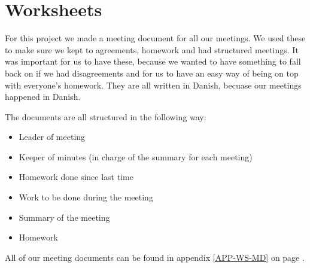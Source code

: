 \chapter{Worksheets}
For this project we made a meeting document for all our meetings. We used
these to make sure we kept to agreements, homework and had structured meetings. It
was important for us to have these, because we wanted to have something to fall
back on if we had disagreements and for us to have an easy way of being on top
with everyone's homework. They are all written in Danish, becuase our meetings
happened in Danish.

The documents are all structured in the following way: 
\begin{itemize}
  \item Leader of meeting
  \item Keeper of minutes (in charge of the summary for each meeting)
  \item Homework done since last time
  \item Work to be done during the meeting
  \item Summary of the meeting
  \item Homework
\end{itemize}

All of our meeting documents can be found in appendix \ref{APP-WS-MD} on page
\pageref{APP-WS-MD}.
